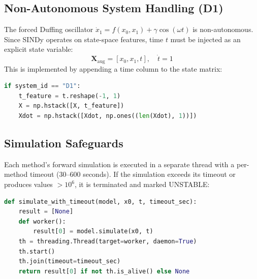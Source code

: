 \subsection{Non-Autonomous System Handling (D1)}

The forced Duffing oscillator $\dot{x}_1 = f(x_0, x_1) + \gamma\cos(\omega t)$ is non-autonomous. Since SINDy operates on state-space features, time $t$ must be injected as an explicit state variable:
\begin{equation}
\mathbf{X}_\text{aug} = [x_0, x_1, t], \quad \dot{t} = 1
\end{equation}
This is implemented by appending a time column to the state matrix:

\begin{lstlisting}[language=Python, caption={Time augmentation for non-autonomous D1}]
if system_id == "D1":
    t_feature = t.reshape(-1, 1)
    X = np.hstack([X, t_feature])
    Xdot = np.hstack([Xdot, np.ones((len(Xdot), 1))])
\end{lstlisting}

\subsection{Simulation Safeguards}

Each method's forward simulation is executed in a separate thread with a per-method timeout (30--600 seconds). If the simulation exceeds its timeout or produces values $> 10^6$, it is terminated and marked UNSTABLE:

\begin{lstlisting}[language=Python, caption={Thread-based simulation timeout}]
def simulate_with_timeout(model, x0, t, timeout_sec):
    result = [None]
    def worker():
        result[0] = model.simulate(x0, t)
    th = threading.Thread(target=worker, daemon=True)
    th.start()
    th.join(timeout=timeout_sec)
    return result[0] if not th.is_alive() else None
\end{lstlisting}
